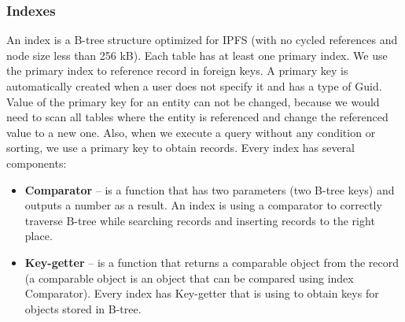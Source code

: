 \subsubsection{Indexes}
An index is a B-tree structure optimized for IPFS (with no cycled references and node size less than 256 kB). Each table has at least one primary index. We use the primary index to reference record in foreign keys. A primary key is automatically created when a user does not specify it and has a type of Guid. Value of the primary key for an entity can not be changed, because we would need to scan all tables where the entity is referenced and change the referenced value to a new one. Also, when we execute a query without any condition or sorting, we use a primary key to obtain records. Every index has several components: 
\begin{itemize}
    \item \textbf{Comparator} -- is a function that has two parameters (two B-tree keys) and outputs a number as a result. An index is using a comparator to correctly traverse B-tree while searching records and inserting records to the right place.
    \item \textbf{Key-getter} -- is a function that returns a comparable object from the record (a comparable object is an object that can be compared using index Comparator). Every index has Key-getter that is using to obtain keys for objects stored in B-tree.
\end{itemize}

